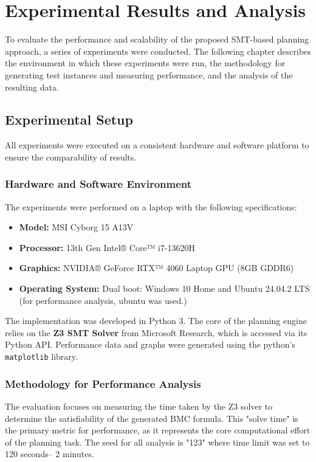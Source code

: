 \documentclass[12pt, a4paper, oneside]{report} %
\begin{document}
\chapter{Experimental Results and Analysis}
\label{chap:results}
To evaluate the performance and scalability of the proposed SMT-based planning approach, a series of experiments were conducted. The following chapter describes the environment in which these experiments were run, the methodology for generating test instances and measuring performance, and the analysis of the resulting data.
\section{Experimental Setup}
\label{sec:exp_setup}

All experiments were executed on a consistent hardware and software platform to ensure the comparability of results.
\subsection{Hardware and Software Environment}

The experiments were performed on a laptop with the following specifications:
\begin{itemize}
    \item \textbf{Model:} MSI Cyborg 15 A13V
    \item \textbf{Processor:} 13th Gen Intel® Core™ i7-13620H
    \item \textbf{Graphics:} NVIDIA® GeForce RTX™ 4060 Laptop GPU (8GB GDDR6)
    \item \textbf{Operating System:} Dual boot: Windows 10 Home and Ubuntu 24.04.2 LTS (for performance analysis, ubuntu was used.)

\end{itemize}

The implementation was developed in Python 3. The core of the planning engine relies on the \textbf{Z3 SMT Solver} from Microsoft Research, which is accessed via its Python API. Performance data and graphs were generated using the python's \texttt{matplotlib} library.
\subsection{Methodology for Performance Analysis}

The evaluation focuses on measuring the time taken by the Z3 solver to determine the satisfiability of the generated BMC formula. This "solve time" is the primary metric for performance, as it represents the core computational effort of the planning task. The seed for all analysis is "123" where time limit was set to 120 seconds-- 2 minutes.
\end{document}
